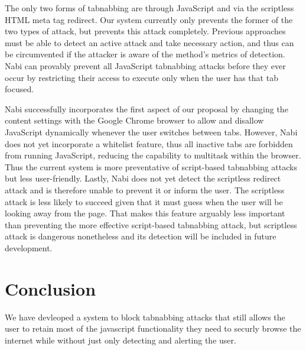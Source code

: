 \documentclass[12pt]{article}
\begin{document}
\begin{doublespace}
The only two forms of tabnabbing are through JavaScript and via the scriptless HTML meta tag redirect. Our system currently only prevents the former of the two types of attack, but prevents this attack completely. Previous approaches must be able to detect an active attack and take necessary action, and thus can be circumvented if the attacker is aware of the method's metrics of detection. Nabi can provably prevent all JavaScript tabnabbing attacks before they ever occur by restricting their access to execute only when the user has that tab focused.

Nabi successfully incorporates the first aspect of our proposal by changing the content settings with the Google Chrome browser to allow and disallow JavaScript dynamically whenever the user switches between tabs. However, Nabi does not yet incorporate a whitelist feature, thus all inactive tabs are forbidden from running JavaScript, reducing the capability to multitask within the browser. Thus the current system is more preventative of script-based tabnabbing attacks but less user-friendly. Lastly, Nabi does not yet detect the scriptless redirect attack and is therefore unable to prevent it or inform the user. The scriptless attack is less likely to succeed given that it must guess when the user will be looking away from the page. That makes this feature arguably less important than preventing the more effective script-based tabnabbing attack, but scriptless attack is dangerous nonetheless and its detection will be included in future development.

\section{Conclusion}

We have devleoped a system to block tabnabbing attacks that still allows the user to retain most of the javascript functionality they need to securly browse the internet while without just only detecting and alerting the user. 


\end{doublespace}




\end{document}
